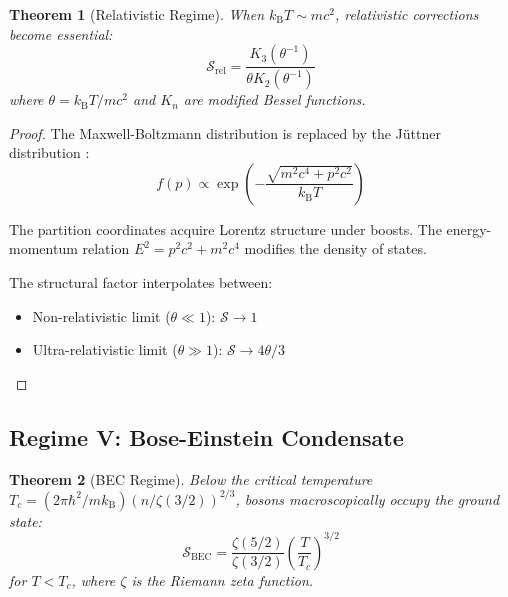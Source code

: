 \documentclass[twocolumn,10pt,a4paper]{article}
\newtheorem{theorem}{Theorem}[section]
\theoremstyle{definition}
\theoremstyle{remark}
\newcommand{\kB}{k_{\mathrm{B}}}
\begin{document}
\begin{theorem}[Relativistic Regime]
When $\kB T \sim mc^2$, relativistic corrections become essential:
\begin{equation}
    \mathcal{S}_{\text{rel}} = \frac{K_3(\theta^{-1})}{\theta K_2(\theta^{-1})}
\end{equation}
where $\theta = \kB T/mc^2$ and $K_n$ are modified Bessel functions.
\end{theorem}

\begin{proof}
The Maxwell-Boltzmann distribution is replaced by the J\"{u}ttner distribution \cite{juttner1911}:
\begin{equation}
    f(p) \propto \exp\left(-\frac{\sqrt{m^2c^4 + p^2c^2}}{\kB T}\right)
\end{equation}

The partition coordinates acquire Lorentz structure under boosts. The energy-momentum relation $E^2 = p^2c^2 + m^2c^4$ modifies the density of states.

The structural factor interpolates between:
\begin{itemize}
    \item Non-relativistic limit ($\theta \ll 1$): $\mathcal{S} \to 1$
    \item Ultra-relativistic limit ($\theta \gg 1$): $\mathcal{S} \to 4\theta/3$
\end{itemize}
\end{proof}

\subsection{Regime V: Bose-Einstein Condensate}

\begin{theorem}[BEC Regime]
Below the critical temperature $T_c = (2\pi\hbar^2/m\kB)(n/\zeta(3/2))^{2/3}$, bosons macroscopically occupy the ground state:
\begin{equation}
    \mathcal{S}_{\text{BEC}} = \frac{\zeta(5/2)}{\zeta(3/2)}\left(\frac{T}{T_c}\right)^{3/2}
\end{equation}
for $T < T_c$, where $\zeta$ is the Riemann zeta function.
\end{theorem}
\end{document}
